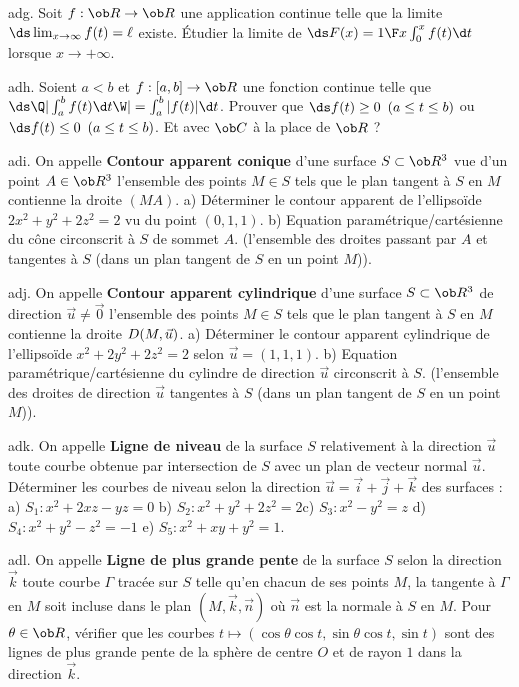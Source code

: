 \exo [Level=2,Fight=1,Learn=1,Field=\FonctionsDéfiniesParUneIntégrale,Type=\Exercices,Origin=] adg. 
Soit $f:\ob R\to\ob R$ une application continue telle que la limite $\ds \lim_{x\to\infty}f(t)=\ell$ existe. \pn 
Étudier la limite de $\ds F(x)={1\F x}\int_0^xf(t)\d t$ lorsque $x\to+\infty$. 
 
\exo [Level=2,Fight=2,Learn=2,Field=\Intégrales,Type=\Exercices,Origin=\MP] adh. 
Soient $a<b$ et $f:[a,b]\to\ob R$ une fonction continue telle que $\ds\Q|\int_a^bf(t)\d t\W|=\int_a^b|f(t)|\d t$. \pn
Prouver que $\ds f(t)\ge0\ \,(a\le t\le b)$ ou $\ds f(t)\le 0\ \,(a\le t\le b)$.  Et avec $\ob C$ à la place de $\ob R$ ?

\exo [Level=2,Fight=3,Learn=2,Field=\Surfaces,Type=\Exercices,Origin=\MP] adi.  
On appelle {\bf Contour apparent conique} d'une surface $S\subset\ob R^3$ 
vue d'un point $A\in\ob R^3$ l'ensemble des points $M\in S$ tels que le plan tangent à $S$ en $M$ contienne la droite $(MA)$. \pn
a) Déterminer le contour apparent de l'ellipsoïde $2x^2+y^2+2z^2=2$ vu du point $(0,1,1)$. \smallskip\noindent
b) Equation paramétrique/cartésienne du cône circonscrit à $S$ de sommet $A$. (l'ensemble des droites passant par $A$ et tangentes à $S$ 
(dans un plan tangent de $S$ en un point $M$)). 

\exo [Level=2,Fight=3,Learn=2,Field=\Surfaces,Type=\Exercices,Origin=\MP] adj. 
On appelle  {\bf Contour apparent cylindrique} d'une surface $S\subset\ob R^3$ 
de direction $\vec u\neq\vec 0$ l'ensemble des points $M\in S$ tels que le plan tangent à $S$ en $M$ 
contienne la droite $\sc D(M,\vec u)$. \smallskip\noindent
a) Déterminer le contour apparent cylindrique de l'ellipsoïde $x^2+2y^2+2z^2=2$ 
selon $\vec u=(1,1,1)$. \pn
b) Equation paramétrique/cartésienne du cylindre de direction $\vec u$ 
circonscrit à $S$. (l'ensemble des droites de direction  $\vec u$ tangentes à $S$ 
(dans un plan tangent de $S$ en un point $M$)). 

\exo [Level=2,Fight=3,Learn=2,Field=\Surfaces,Type=\Exercices,Origin=\MP] adk. 
On appelle {\bf Ligne de niveau} de la surface $S$ relativement à la direction $\vec u$ 
toute courbe obtenue par intersection de $S$ avec un plan de vecteur normal $\vec u$. \pn
Déterminer les courbes de niveau selon la direction $\vec u=\vec i+\vec j+\vec k$ des surfaces : \pn
a)  $S_1: x^2+2xz-yz=0$ \qquad b) $S_2:x^2+y^2+2z^2=2$\qquad c) $S_3: x^2-y^2=z$ \pn
d) $S_4:x^2+y^2-z^2=-1$ \qquad e) $S_5:x^2+xy+y^2=1$.

\exo [Level=2,Fight=3,Learn=2,Field=\Surfaces,Type=\Exercices,Origin=\MP] adl. 
On appelle {\bf Ligne de plus grande pente} de la surface $S$ selon la direction $\vec k$ 
toute courbe $\Gamma$ tracée sur $S$ telle qu'en chacun de ses points $M$, la tangente à $\Gamma$ en $M$ soit incluse dans le plan $(M,\vec k, \vec n)$ 
où $\vec n$ est la normale à $S$ en $M$. \pn
Pour $\theta\in\ob R$, vérifier que les courbes $t\mapsto(\cos\theta\cos t,\sin\theta\cos t,\sin t)$ 
sont des lignes de plus grande pente  de la sphère de centre $O$ et de rayon $1$ dans la direction $\vec k$. 

